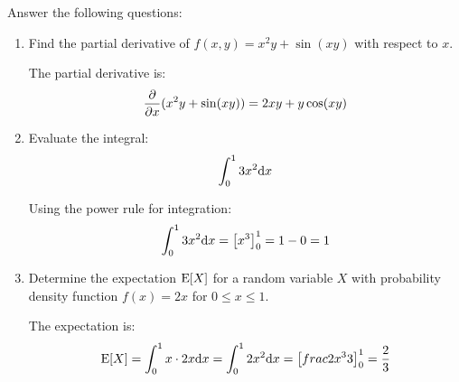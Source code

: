\documentclass[12pt]{article}
\begin{document}
\begin{homeworkProblem}
    Answer the following questions:
    
    \begin{enumerate}[label = (\alph*)]
        \item Find the partial derivative of $f(x,y) = x^2y + \sin(xy)$ with respect to $x$.
        
        The partial derivative is:
        \begin{equation}
            \frac{\partial}{\partial x} (x^2y + \sin(xy)) = 2xy + y\cos(xy)
        \end{equation}
        
        \item Evaluate the integral:
        \begin{equation}
            \int_0^1 3x^2 \mathrm{d}x
        \end{equation}
        
        Using the power rule for integration:
        \begin{equation}
            \int_0^1 3x^2 \mathrm{d}x = \left[ x^3 \right]_0^1 = 1 - 0 = 1
        \end{equation}
        
        \item Determine the expectation $\mathrm{E}[X]$ for a random variable $X$ with probability density function $f(x) = 2x$ for $0 \leq x \leq 1$.
        
        The expectation is:
        \begin{equation}
            \mathrm{E}[X] = \int_0^1 x \cdot 2x \mathrm{d}x = \int_0^1 2x^2 \mathrm{d}x = \left[ frac{2x^3}{3} \right]_0^1 = \frac{2}{3}
        \end{equation}
    \end{enumerate}
\end{homeworkProblem}
\end{document}
